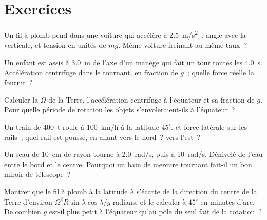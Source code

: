\section{Exercices}

\begin{exercise}[$\star$]\label{exo:b1:non-inertial-frames:1}
Un fil à plomb pend dans une voiture qui accélère à \qty{2.5}{m/s^2}~:
angle avec la verticale, et tension en unités de $mg$. Même voiture
freinant au même taux~?
\end{exercise}

\begin{exercise}[$\star$]\label{exo:b1:non-inertial-frames:2}
Un enfant est assis à \qty{3.0}{m} de l'axe d'un manège qui fait un tour
toutes les \qty{4.0}{s}. Accélération centrifuge dans le 
tournant, en fraction de $g$~; quelle force réelle la fournit~?
\end{exercise}

\begin{exercise}[$\star$]\label{exo:b1:non-inertial-frames:3}
Calculer la  $\Omega$ de la Terre, l'accélération
centrifuge à l'équateur et sa fraction de $g$. Pour quelle période de
rotation les objets s'envoleraient-ils à l'équateur~?
\end{exercise}

\begin{exercise}[$\star$]\label{exo:b1:non-inertial-frames:4}
Un train de \qty{400}{t} roule à \qty{100}{km/h} à la latitude $45^\circ$.
 et force latérale sur les rails~; quel rail est
poussé, en allant vers le nord~? vers l'est~?
\end{exercise}

\begin{exercise}[$\star\star$]\label{exo:b1:non-inertial-frames:5}
Un seau de \qty{10}{cm} de rayon tourne à \qty{2.0}{rad/s}, puis à
\qty{10}{rad/s}. Dénivelé de l'eau entre le bord et le centre. Pourquoi
un bain de mercure tournant fait-il un bon miroir de télescope~?
\end{exercise}

\begin{exercise}[$\star\star$]\label{exo:b1:non-inertial-frames:6}
Montrer que le fil à plomb à la latitude $\lambda$ s'écarte de la
direction du centre de la Terre d'environ
$\Omega^2R\sin\lambda\cos\lambda/g$ radians, et le calculer à $45^\circ$
en minutes d'arc. De combien $g$ est-il plus petit à l'équateur qu'au
pôle du seul fait de la rotation~?
\end{exercise}

